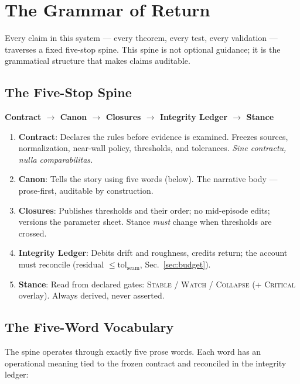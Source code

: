 \documentclass[
  aps,
  prd,
  preprint,
  superscriptaddress,
  nofootinbib,
  floatfix,
  longbibliography
]{revtex4-2}
\newcommand{\tolseam}{\mathrm{tol}_{\mathrm{seam}}}
\newcommand{\regime}[1]{\textnormal{\textsc{#1}}}
\newcommand{\lat}[1]{\textit{#1}}
\begin{document}
\section{The Grammar of Return}\label{sec:grammar}

Every claim in this system — every theorem, every test,
every validation — traverses a fixed five-stop spine.
This spine is not optional guidance; it is the
grammatical structure that makes claims auditable.

\subsection{The Five-Stop Spine}

\begin{center}
\textbf{Contract $\to$ Canon $\to$ Closures $\to$
  Integrity Ledger $\to$ Stance}
\end{center}

\begin{enumerate}[nosep,leftmargin=*]
  \item \textbf{Contract}: Declares the rules before
    evidence is examined.
    Freezes sources, normalization, near-wall policy,
    thresholds, and tolerances.
    \lat{Sine contractu, nulla comparabilitas.}
  \item \textbf{Canon}: Tells the story using
    five words (below).
    The narrative body — prose-first, auditable by construction.
  \item \textbf{Closures}: Publishes thresholds and their
    order; no mid-episode edits; versions the parameter sheet.
    Stance \emph{must} change when thresholds are crossed.
  \item \textbf{Integrity Ledger}: Debits drift and roughness,
    credits return; the account must reconcile
    (residual $\leq \tolseam$, Sec.~\ref{sec:budget}).
  \item \textbf{Stance}: Read from declared gates:
    \regime{Stable} / \regime{Watch} / \regime{Collapse}
    (+ \regime{Critical} overlay).
    Always derived, never asserted.
\end{enumerate}

\subsection{The Five-Word Vocabulary}

The spine operates through exactly five prose words.
Each word has an operational meaning tied to the frozen
contract and reconciled in the integrity ledger:
\end{document}
